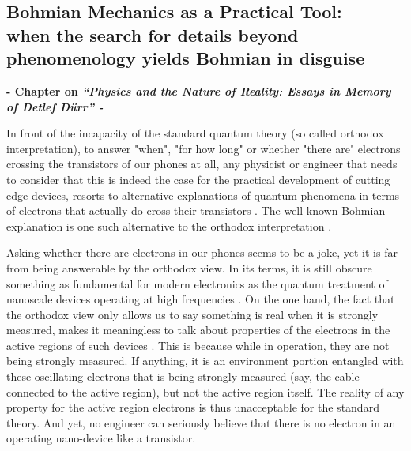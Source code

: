 \documentclass[11pt, a4paper]{article} %
\begin{document}
\newpage
{}
\setcounter{page}{1}
\begin{center}
\section*{ Bohmian Mechanics as a Practical Tool:\\ \vspace{0.2cm} \small when the search for details beyond phenomenology yields Bohmian in disguise }\vspace{-0.4cm}
{\bf \small - Chapter on {\em “Physics and the Nature of Reality: Essays in Memory of Detlef Dürr” - }}\vspace{-0.32cm}
\end{center}

\hspace*{4mm} In front of the incapacity of the standard quantum theory (so called orthodox interpretation), to answer "when", "for how long" or whether "there are" electrons crossing the transistors of our phones at all, any physicist or engineer that needs to consider that this is indeed the case for the practical development of cutting edge devices, resorts to alternative explanations of quantum phenomena in terms of electrons that actually do cross their transistors \cite{where}. The well known Bohmian explanation is one such alternative to the orthodox interpretation \cite{Bohm,Holland, Durr,JordiXavier}. 

Asking whether there are electrons in our phones seems to be a joke, yet it is far from being answerable by the orthodox view. In its terms, it is still obscure something as fundamental for modern electronics as the quantum treatment of nanoscale devices operating at high frequencies \cite{Thz}. On the one hand, the fact that the orthodox view only allows us to say something is real when it is strongly measured, makes it meaningless to talk about properties of the electrons in the active regions of such devices \cite{where}. This is because while in operation, they are not being strongly measured. If anything, it is an environment portion entangled with these oscillating electrons that is being strongly measured (say, the cable connected to the active region), but not the active region itself. The reality of any property for the active region electrons is thus unacceptable for the standard theory. And yet, no engineer can seriously believe that there is no electron in an operating nano-device like a transistor. \vspace{-0.1cm}
\end{document}
